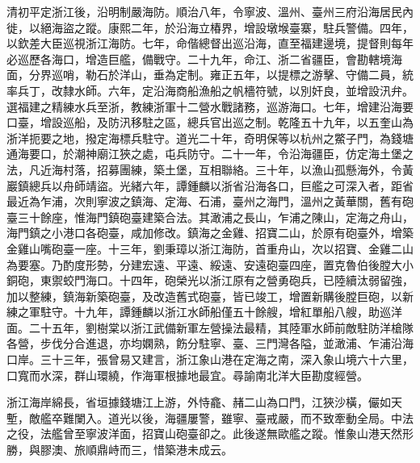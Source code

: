 \begin{pinyinscope}
清初平定浙江後，沿明制嚴海防。順治八年，令寧波、溫州、臺州三府沿海居民內徙，以絕海盜之蹤。康熙二年，於沿海立椿界，增設墩堠臺寨，駐兵警備。四年，以欽差大臣巡視浙江海防。七年，命偕總督出巡沿海，直至福建邊境，提督則每年必巡歷各海口，增造巨艦，備戰守。二十九年，命江、浙二省疆臣，會勘轄境海面，分界巡哨，勒石於洋山，垂為定制。雍正五年，以提標之游擊、守備二員，統率兵丁，改隸水師。六年，定沿海商船漁船之帆檣符號，以別奸良，並增設汛弁。選福建之精練水兵至浙，教練浙軍十二營水戰諸務，巡游海口。七年，增建沿海要口臺，增設巡船，及防汛移駐之區，總兵官出巡之制。乾隆五十九年，以五奎山為浙洋扼要之地，撥定海標兵駐守。道光二十年，奇明保等以杭州之鱉子門，為錢塘通海要口，於潮神廟江狹之處，屯兵防守。二十一年，令沿海疆臣，仿定海土堡之法，凡近海村落，招募團練，築土堡，互相聯絡。三十年，以漁山孤懸海外，令黃巖鎮總兵以舟師靖盜。光緒六年，譚鍾麟以浙省沿海各口，巨艦之可深入者，距省最近為乍浦，次則寧波之鎮海、定海、石浦，臺州之海門，溫州之黃華關，舊有砲臺三十餘座，惟海門鎮砲臺建築合法。其澉浦之長山，乍浦之陳山，定海之舟山，海門鎮之小港口各砲臺，咸加修改。鎮海之金雞、招寶二山，於原有砲臺外，增築金雞山嘴砲臺一座。十三年，劉秉璋以浙江海防，首重舟山，次以招寶、金雞二山為要塞。乃酌度形勢，分建宏遠、平遠、綏遠、安遠砲臺四座，置克魯伯後膛大小銅砲，東禦蛟門海口。十四年，砲榮光以浙江原有之營勇砲兵，已陸續汰弱留強，加以整練，鎮海新築砲臺，及改造舊式砲臺，皆已竣工，增置新購後膛巨砲，以新練之軍駐守。十九年，譚鍾麟以浙江水師船僅五十餘艘，增紅單船八艘，助巡洋面。二十五年，劉樹棠以浙江武備新軍左營操法最精，其陸軍水師前敵駐防洋槍隊各營，步伐分合進退，亦均嫻熟，飭分駐寧、臺、三門灣各隘，並澉浦、乍浦沿海口岸。三十三年，張曾易又建言，浙江象山港在定海之南，深入象山境六十六里，口寬而水深，群山環繞，作海軍根據地最宜。尋諭南北洋大臣勘度經營。

浙江海岸綿長，省垣據錢塘江上游，外恃龕、赭二山為口門，江狹沙橫，儼如天塹，敵艦卒難闌入。道光以後，海疆屢警，雖寧、臺戒嚴，而不致牽動全局。中法之役，法艦曾至寧波洋面，招寶山砲臺卻之。此後遂無歐艦之蹤。惟象山港天然形勝，與膠澳、旅順鼎峙而三，惜築港未成云。


\end{pinyinscope}
